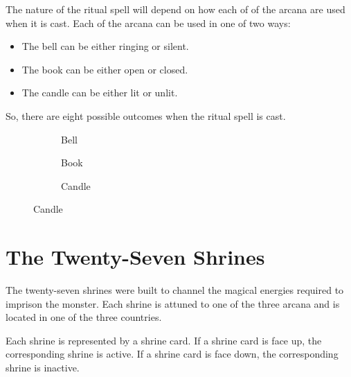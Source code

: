 \documentclass[10pt, parskip=half-, twoside]{scrartcl}
\begin{document}
The nature of the ritual spell will depend on how each of of the arcana are used when it is cast. Each of the arcana can be used in one of two ways:
\begin{itemize}[itemindent=*, leftmargin=*]
\item The bell can be either ringing or silent.
\item The book can be either open or closed.
\item The candle can be either lit or unlit.
\end{itemize}
So, there are eight possible outcomes when the ritual spell is cast.
\vfill
\begin{figure}[hb]
\centering
\begin{subfigure}{0.3\textwidth}
\centering
{}
\caption*{Bell}
\end{subfigure}
\hfill
\begin{subfigure}{0.3\textwidth}
\centering
{}
\caption*{Book}
\end{subfigure}
\hfill
\begin{subfigure}{0.3\textwidth}
\centering
{}
\caption*{Candle}
\end{subfigure}
\end{figure}

\newpage

\section*{The Twenty-Seven Shrines}
The twenty-seven shrines were built to channel the magical energies required to imprison the monster. Each shrine is attuned to one of the three arcana and is located in one of the three countries.

Each shrine is represented by a shrine card.
If a shrine card is face up, the corresponding shrine is active.
If a shrine card is face down, the corresponding shrine is inactive.
\end{document}
